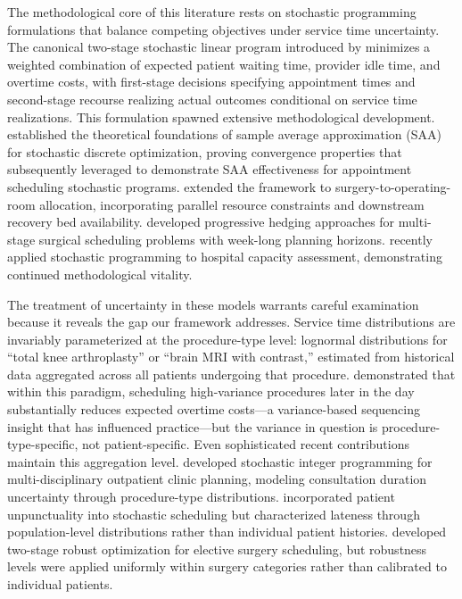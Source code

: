 The methodological core of this literature rests on stochastic programming formulations that balance competing objectives under service time uncertainty. The canonical two-stage stochastic linear program introduced by \citet{denton2003sequential} minimizes a weighted combination of expected patient waiting time, provider idle time, and overtime costs, with first-stage decisions specifying appointment times and second-stage recourse realizing actual outcomes conditional on service time realizations. This formulation spawned extensive methodological development. \citet{kleywegt2002sample} established the theoretical foundations of sample average approximation (SAA) for stochastic discrete optimization, proving convergence properties that \citet{mancilla2012sample} subsequently leveraged to demonstrate SAA effectiveness for appointment scheduling stochastic programs. \citet{denton2010optimal} extended the framework to surgery-to-operating-room allocation, incorporating parallel resource constraints and downstream recovery bed availability. \citet{gul2015progressive} developed progressive hedging approaches for multi-stage surgical scheduling problems with week-long planning horizons. \citet{marchesi2025stochastic} recently applied stochastic programming to hospital capacity assessment, demonstrating continued methodological vitality.

The treatment of uncertainty in these models warrants careful examination because it reveals the gap our framework addresses. Service time distributions are invariably parameterized at the procedure-type level: lognormal distributions for ``total knee arthroplasty'' or ``brain MRI with contrast,'' estimated from historical data aggregated across all patients undergoing that procedure. \citet{denton2007optimization} demonstrated that within this paradigm, scheduling high-variance procedures later in the day substantially reduces expected overtime costs---a variance-based sequencing insight that has influenced practice---but the variance in question is procedure-type-specific, not patient-specific. Even sophisticated recent contributions maintain this aggregation level. \citet{leeftink2019stochastic} developed stochastic integer programming for multi-disciplinary outpatient clinic planning, modeling consultation duration uncertainty through procedure-type distributions. \citet{jiang2019stochastic} incorporated patient unpunctuality into stochastic scheduling but characterized lateness through population-level distributions rather than individual patient histories. \citet{neyshabouri2017two} developed two-stage robust optimization for elective surgery scheduling, but robustness levels were applied uniformly within surgery categories rather than calibrated to individual patients.

